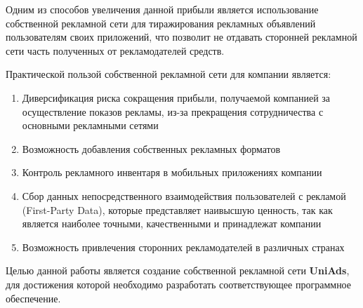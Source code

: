 \documentclass[times]{itmo-student-thesis}
\begin{document}
Одним из способов увеличения данной прибыли является использование собственной рекламной сети для тиражирования рекламных объявлений пользователям своих приложений, что позволит не отдавать сторонней рекламной сети часть полученных от рекламодателей средств.

Практической пользой собственной рекламной сети для компании является:

\begin{enumerate}
	\item Диверсификация риска сокращения прибыли, получаемой компанией за осуществление показов рекламы, из-за прекращения сотрудничества с основными рекламными сетями
	\item Возможность добавления собственных рекламных форматов
	\item Контроль рекламного инвентаря в мобильных приложениях компании
	\item Сбор данных непосредственного взаимодействия пользователей с рекламой (First-Party Data), которые представляет наивысшую ценность, так как является наиболее точными, качественными и принадлежат компании
	\item Возможность привлечения сторонних рекламодателей в различных странах
\end{enumerate}
\bigbreak


Целью данной работы является создание собственной рекламной сети \textbf{UniAds}, для достижения которой необходимо разработать соответствующее программное обеспечение.



\end{document}
